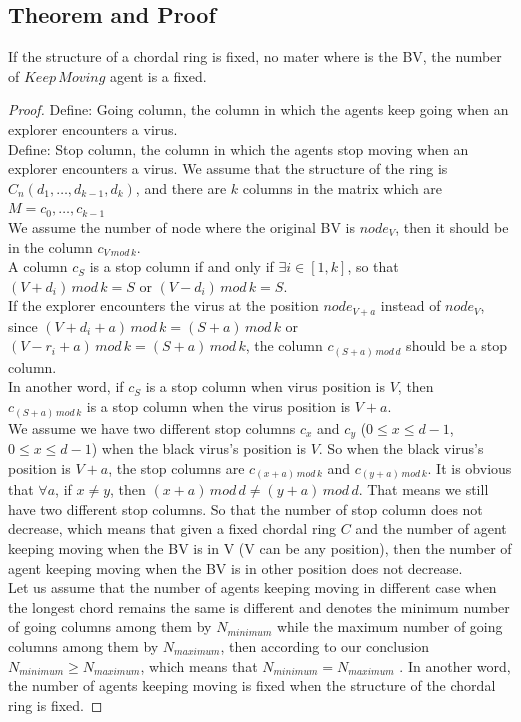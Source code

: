 \subsection{Theorem and Proof}
\begin{theorem}
If the structure of a chordal ring is fixed, no mater where is the BV, the number of $Keep\,Moving$ agent is a fixed.
\end{theorem}
\begin{proof}


Define: Going column, the column in which the agents keep going when an explorer encounters a virus.\\
Define: Stop column, the column in which the agents stop moving when an explorer encounters a virus.
We assume that the structure of the ring is $C_n(d_1, \dots, d_{k-1}, d_k)$, and there are $k$ columns in the matrix which are $M={c_0, \dots, c_{k-1}}$\\
We assume the number of node where the original BV is $node_V$, then it should be in the column $c_{V\,mod\,k}$.\\
A column $c_S$ is a stop column if and only if $\exists i\in [1,k]$, so that $(V+d_i)\,mod\,k=S$ or $(V-d_i)\,mod\,k=S$.\\
If the explorer encounters the virus at the position $node_{V+a}$ instead of $node_V$, since $(V+d_i+a)\,mod\,k=(S+a)\,mod\,k$ or $(V-r_i+a)\,mod\,k=(S+a)\,mod\,k$, the column $c_{(S+a)\,mod\,d}$ should be a stop column.\\
In another word, if $c_S$ is a stop column when virus position is $V$, then $c_{(S+a)\,mod\,k}$ is a stop column when the virus position is $V+a$.\\
We assume we have two different stop columns $c_x$ and $c_y$ ($0\leq x\leq d-1$, $0\leq x\leq d-1$) when the black virus's position is $V$.  So when the black virus's position is $V+a$, the stop columns are $c_{(x+a)\,mod\,k}$ and $c_{(y+a)\,mod\,k}$. It is obvious that $\forall a$, if $x\neq y$, then $(x+a)\,mod\,d\neq(y+a)\,mod\,d$. That means we still have two different stop columns. So that the number of stop column does not decrease, which means that given a fixed chordal ring $C$ and the number of agent keeping moving when the BV is in V (V can be any position), then the number of agent keeping moving when the BV is in other position does not decrease.\\
Let us assume that the number of agents keeping moving in different case when the longest chord remains the same is different and denotes the minimum number of going columns among them by $N_{minimum}$ while the maximum number of going columns among them by $N_{maximum}$, then according to our conclusion $N_{minimum}\geq N_{maximum}$, which means that $N_{minimum}= N_{maximum}$ . In another word, the number of agents keeping moving is fixed when the structure of the chordal ring is fixed. 
\end{proof}

